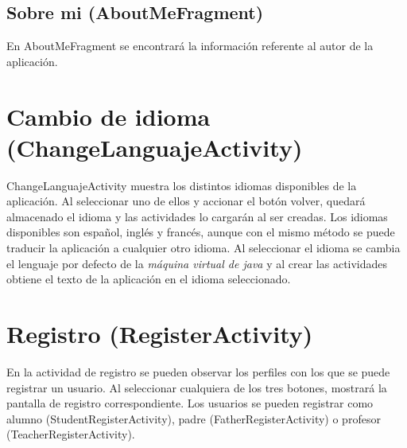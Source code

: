 		\subsection{Sobre mi ({\ttfamily AboutMeFragment})}
			En {\ttfamily AboutMeFragment} se encontrará la información referente al autor de la aplicación.
	
	\section{Cambio de idioma ({\ttfamily ChangeLanguajeActivity})}
	
		{\ttfamily ChangeLanguajeActivity} muestra los distintos idiomas disponibles de la aplicación. Al seleccionar uno de ellos y accionar el botón volver, quedará almacenado el idioma y las actividades lo cargarán al ser creadas. Los idiomas disponibles son español, inglés y francés, aunque con el mismo método se puede traducir la aplicación a cualquier otro idioma.
		Al seleccionar el idioma se cambia el lenguaje por defecto de la {\it máquina virtual de java} \cite{59:jvm:online} y al crear las actividades obtiene el texto de la aplicación en el idioma seleccionado.
			
	\section{Registro ({\ttfamily RegisterActivity})} \label{sec:register}
		
		En la actividad de registro se pueden observar los perfiles con los que se puede registrar un usuario. Al seleccionar cualquiera de los tres botones, mostrará la pantalla de registro correspondiente. Los usuarios se pueden registrar como alumno ({\ttfamily StudentRegisterActivity}), padre ({\ttfamily FatherRegisterActivity}) o profesor ({\ttfamily TeacherRegisterActivity}).
		
